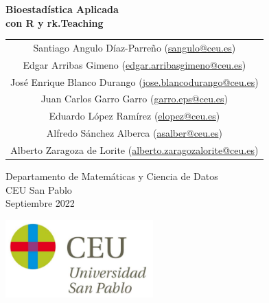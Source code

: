 \begin{titlepage}
\thispagestyle{empty}
\vspace*{7cm}
\par

\begin{center}
\normalfont\fontsize{30}{30}\selectfont
{\bfseries \color{blueceu}Bioestadística Aplicada\\ con R y rk.Teaching}
\end{center}
\vspace{1cm}

\begin{center}
\Large
\begin{tabular}{c}
Santiago Angulo Díaz-Parreño (\url{sangulo@ceu.es})\\
Edgar Arribas Gimeno (\url{edgar.arribasgimeno@ceu.es})\\
José Enrique Blanco Durango (\url{jose.blancodurango@ceu.es})\\
Juan Carlos Garro Garro (\url{garro.eps@ceu.es})\\
Eduardo López Ramírez (\url{elopez@ceu.es})\\
Alfredo Sánchez Alberca (\url{asalber@ceu.es})\\
Alberto Zaragoza de Lorite (\url{alberto.zaragozalorite@ceu.es})    
\end{tabular}

\medskip 
Departamento de Matemáticas y Ciencia de Datos\\ CEU San Pablo\\[1cm]
\medskip 
Septiembre 2022

\vspace{1cm}
\includegraphics[height=3cm]{img/logo_uspceu}
\end{center}
\vfill
\end{titlepage}